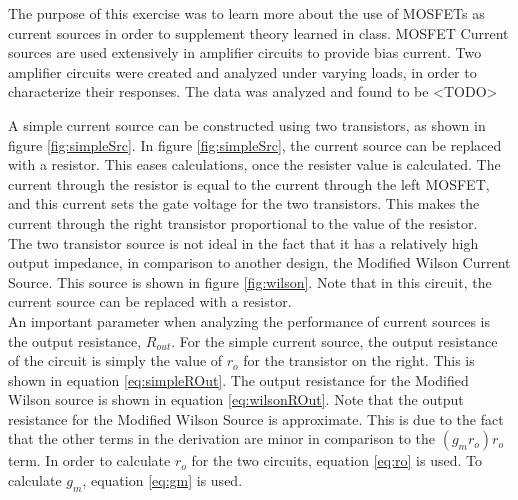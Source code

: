 
\def \labnum	{\#3}
\def \tonames   {Tyler Nicholson}
\def \disptitle	{MOSFET Current Sources}
\def \datestart	{03-20-2015}
\def \dateend	{04-03-2015}






The purpose of this exercise was to learn more about the use of MOSFETs as current sources in order to supplement theory learned in class. 
MOSFET Current sources are used extensively in amplifier circuits to provide bias current. 
Two amplifier circuits were created and analyzed under varying loads, in order to characterize their responses. 
The data was analyzed and found to be <TODO>

A simple current source can be constructed using two transistors, as shown in figure \ref{fig:simpleSrc}.
In figure \ref{fig:simpleSrc}, the current source can be replaced with a resistor. This eases calculations, once the resister value is calculated. 
The current through the resistor is equal to the current through the left MOSFET, and this current sets the gate voltage for the two transistors. This makes the current through the right transistor proportional to the value of the resistor. 
\\
The two transistor source is not ideal in the fact that it has a relatively high output impedance, in comparison to another design, the Modified Wilson Current Source. This source is shown in figure \ref{fig:wilson}. Note that in this circuit, the current source can be replaced with a resistor. 
\\
An important parameter when analyzing the performance of current sources is the output resistance, $R_{out}$. For the simple current source, the output resistance of the circuit is simply the value of $r_o$ for the transistor on the right. This is shown in equation \ref{eq:simpleROut}.
The output resistance for the Modified Wilson source is shown in equation \ref{eq:wilsonROut}. 
Note that the output resistance for the Modified Wilson Source is approximate. This is due to the fact that the other terms in the derivation are minor in comparison to the $(g_mr_o)r_o$ term. 
In order to calculate $r_o$ for the two circuits, equation \ref{eq:ro} is used. To calculate $g_m$, equation \ref{eq:gm} is used. 




